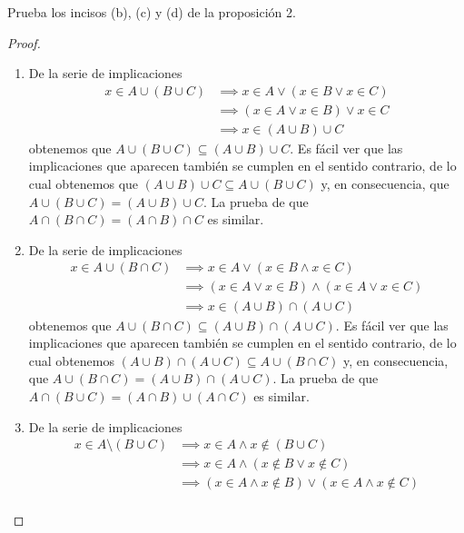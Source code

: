 \documentclass[12pt,a4paper]{book}
\begin{document}
    \begin{ejercicio}
        Prueba los incisos (b), (c) y (d) de la proposición 2.
    \end{ejercicio}

    \begin{proof}
        \begin{enumerate}
            \item[(b)] De la serie de implicaciones
            \begin{align*}
                x\in A\cup(B\cup C)&\implies x\in A\lor(x\in B\lor x\in C)\\
                &\implies (x\in A\lor x\in B)\lor x\in C\\
                &\implies x\in(A\cup B)\cup C
            \end{align*}
            obtenemos que $A\cup(B\cup C)\subseteq (A\cup B)\cup C$. Es fácil ver que las implicaciones
            que aparecen también se cumplen en el sentido contrario, de lo cual obtenemos que $(A\cup B)\cup C\subseteq A\cup(B\cup C)$
            y, en consecuencia, que $A\cup(B\cup C)=(A\cup B)\cup C$. La prueba de que $A\cap(B\cap C)=(A\cap B)\cap C$
            es similar.
            \item[(c)] De la serie de implicaciones
            \begin{align*}
                x\in A\cup(B\cap C)&\implies x\in A\lor(x\in B\wedge x\in C)\\
                &\implies (x\in A\lor x\in B)\wedge(x\in A\lor x\in C)\\
                &\implies x\in (A\cup B)\cap(A\cup C)
            \end{align*}
            obtenemos que $A\cup(B\cap C)\subseteq (A\cup B)\cap(A\cup C)$. Es fácil ver que las implicaciones
            que aparecen también se cumplen en el sentido contrario, de lo cual obtenemos $(A\cup B)\cap(A\cup C)\subseteq A\cup(B\cap C)$ y,
            en consecuencia, que $A\cup(B\cap C)=(A\cup B)\cap(A\cup C)$. La prueba de que $A\cap(B\cup C)=(A\cap B)\cup(A\cap C)$ es
            similar.
            \item[(d)] De la serie de implicaciones
            \begin{align*}
                x\in A\setminus(B\cup C)&\implies x\in A \wedge x\notin(B\cup C)\\
                &\implies x\in A\wedge(x\notin B\lor x\notin C)\\
                &\implies (x\in A\wedge x\notin B)\lor (x\in A\wedge x\notin C)\\

\end{align*}
\end{enumerate}
\end{proof}
\end{document}
